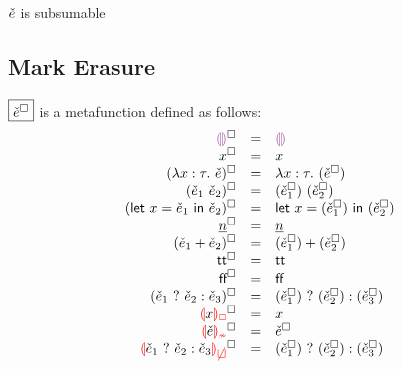 \documentclass{article}
\begin{document}
\judgbox{\subsumable{\ECMV}} $\ECMV$ is subsumable
%
\begin{mathpar}








\end{mathpar}

\subsection{Mark Erasure}
$\judgbox{\erase{\ECMV}}$ is a metafunction defined as follows:
%
\newcommand{\erasesToRow}[2]{\erase{#1} & = & #2}
\[\begin{array}{rcl}
  \erasesToRow{\ECEHole}{\EEHole} \\
  \erasesToRow{x}{x} \\
  \erasesToRow{(\ECLam{x}{\TMV}{\ECMV})}{\ELam{x}{\TMV}{(\erase{\ECMV})}} \\
  \erasesToRow{(\ECAp{\ECMV_1}{\ECMV_2})}{\EAp{(\erase{\ECMV_1})}{(\erase{\ECMV_2})}} \\
  \erasesToRow{(\ECLet{x}{\ECMV_1}{\ECMV_2})}{\ELet{x}{(\erase{\ECMV_1})}{(\erase{\ECMV_2})}} \\
  \erasesToRow{\ECNumMV}{\ENumMV} \\
  \erasesToRow{(\ECPlus{\ECMV_1}{\ECMV_2})}{\EPlus{(\erase{\ECMV_1})}{(\erase{\ECMV_2})}} \\
  \erasesToRow{\ECTrue}{\ETrue} \\
  \erasesToRow{\ECFalse}{\EFalse} \\
  \erasesToRow{(\ECIf{\ECMV_1}{\ECMV_2}{\ECMV_3})}{\EIf{(\erase{\ECMV_1})}{(\erase{\ECMV_2})}{(\erase{\ECMV_3})}} \\
  \erasesToRow{\ECUnbound{x}}{x} \\
  \erasesToRow{\ECInconType{\ECMV}}{\erase{\ECMV}} \\
  \erasesToRow{\ECInconBr{\ECMV_1}{\ECMV_2}{\ECMV_3}}{\EIf{(\erase{\ECMV_1})}{(\erase{\ECMV_2})}{(\erase{\ECMV_3})}} \\
\end{array}\]
\end{document}
